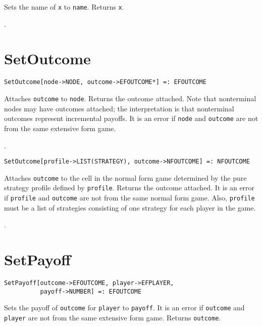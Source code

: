 \noindent
Sets the name of \verb+x+ to \verb+name+.  Returns \verb+x+.

\seealso {}.


\section*{SetOutcome}\label{PrimSetOutcome}
\begin{verbatim} 
SetOutcome[node->NODE, outcome->EFOUTCOME*] =: EFOUTCOME 
\end{verbatim}

\noindent
Attaches \verb+outcome+ to \verb+node+.  Returns the outcome attached.
Note that nonterminal nodes may have outcomes attached; the interpretation
is that nonterminal outcomes represent incremental payoffs.  
It is an error if \verb+node+ and \verb+outcome+ are not from the same
extensive form game.

\seealso {}.

\newsignature

\begin{verbatim} 
SetOutcome[profile->LIST(STRATEGY), outcome->NFOUTCOME] =: NFOUTCOME 
\end{verbatim}

\noindent
Attaches \verb+outcome+ to the cell in the normal form game
determined by the pure strategy profile defined by \verb+profile+.
Returns the outcome attached.  It is an error if \verb+profile+ and
\verb+outcome+ are not from the same normal form game. Also,
\verb+profile+ must be a list of strategies consisting of one strategy
for each player in the game.  

\seealso {}.


\section*{SetPayoff}\label{PrimSetPayoff}
\begin{verbatim}
SetPayoff[outcome->EFOUTCOME, player->EFPLAYER,
          payoff->NUMBER] =: EFOUTCOME 
\end{verbatim}

\noindent
Sets the payoff of \verb+outcome+ for \verb+player+ to \verb+payoff+.
It is an error if \verb+outcome+ and \verb+player+ are not from the
same extensive form game.  Returns \verb+outcome+.

